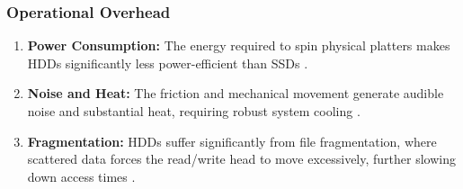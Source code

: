 \subsubsection{Operational Overhead}
\begin{enumerate}[label=\roman*.]
    \item \textbf{Power Consumption:} The energy required to spin physical platters makes HDDs significantly less power-efficient than SSDs \cite{gfg_hdd_memory, wiki_hdd}.
    \item \textbf{Noise and Heat:} The friction and mechanical movement generate audible noise and substantial heat, requiring robust system cooling \cite{gfg_hdd_memory, wiki_hdd}.
    \item \textbf{Fragmentation:} HDDs suffer significantly from file fragmentation, where scattered data forces the read/write head to move excessively, further slowing down access times \cite{gfg_disk_mgmt, wiki_hdd}.
\end{enumerate}
